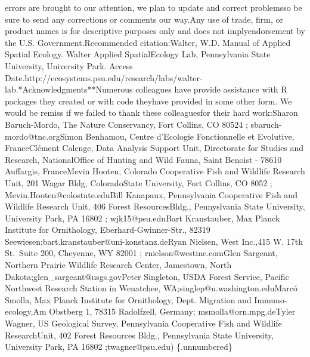 \documentclass[
  letterpaper,
  DIV=11,
  numbers=noendperiod]{scrreprt}
\begin{document}
errors are brought to our attention, we plan to update and correct
problemsso be sure to send any corrections or comments our way.Any use
of trade, firm, or product names is for descriptive purposes only and
does not implyendorsement by the U.S. Government.Recommended
citation:Walter, W.D. Manual of Applied Spatial Ecology. Walter Applied
SpatialEcology Lab, Pennsylvania State University, University Park.
Access
Date.http://ecosystems.psu.edu/research/labs/walter-lab.\newpage**Acknowledgments**Numerous
colleagues have provide assistance with R packages they created or with
code theyhave provided in some other form. We would be remiss if we
failed to thank these colleaguesfor their hard work:Sharon Baruch-Mordo,
The Nature Conservancy, Fort Collins, CO 80524 ;
sbaruch-mordo@tnc.orgSimon Benhamou, Centre d'Ecologie Fonctionnelle et
Evolutive, FranceClément Calenge, Data Analysis Support Unit,
Directorate for Studies and Research, NationalOffice of Hunting and Wild
Fauna, Saint Benoist - 78610 Auffargis, FranceMevin Hooten, Colorado
Cooperative Fish and Wildlife Research Unit, 201 Wagar Bldg,
ColoradoState University, Fort Collins, CO 8052 ;
Mevin.Hooten@colostate.eduBill Kanapaux, Pennsylvania Cooperative Fish
and Wildlife Research Unit, 406 Forest ResourcesBldg., Pennyslvania
State University, University Park, PA 16802 ; wjk15@psu.eduBart
Kranstauber, Max Planck Institute for Ornithology,
Eberhard-Gwinner-Str., 82319
Seewiesen;bart.kranstauber@uni-konstanz.deRyan Nielsen, West Inc.,415 W.
17th St.~Suite 200, Cheyenne, WY 82001 ; rnielson@westinc.comGlen
Sargeant, Northern Prairie Wildlife Research Center, Jamestown, North
Dakota;glen\_sargeant@usgs.govPeter Singleton, USDA Forest Service,
Pacific Northwest Research Station in Wenatchee,
WA;singlep@u.washington.eduMarcó Smolla, Max Planck Institute for
Ornithology, Dept. Migration and Immuno-ecology,Am Obstberg 1, 78315
Radolfzell, Germany; msmolla@orn.mpg.deTyler Wagner, US Geological
Survey, Pennsylvania Cooperative Fish and Wildlife ResearchUnit, 402
Forest Resources Bldg., Pennsylvania State University, University Park,
PA 16802 ;twagner@psu.edu) \{.unnumbered\}

\end{document}
